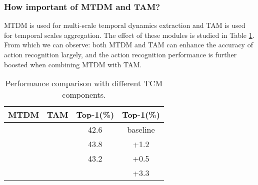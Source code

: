 \documentclass[journal]{IEEEtran}
\begin{document}
\subsubsection{How important of MTDM and TAM?}
MTDM is used for multi-scale temporal dynamics extraction and TAM is used for temporal scales aggregation. The effect of these modules is studied in Table \ref{tab:mtdm-tam}. From which we can observe: both MTDM and TAM can enhance the accuracy of action recognition largely, and the action recognition performance is further boosted when combining MTDM with TAM.
\begin{table}[!ht]
\centering
\caption{Performance comparison with different TCM components.}
\label{tab:mtdm-tam}
\begin{tabular}{ccc|c}
\hline MTDM & TAM &  Top-1(\%) &  Top-1(\%) \\ \hline
 & & 42.6 & baseline \\ \hline
  & & 43.8 & +1.2 \\
  &  & 43.2 & +0.5 \\
  &  &  & +3.3 \\ \hline
\end{tabular}
\end{table}
\end{document}
